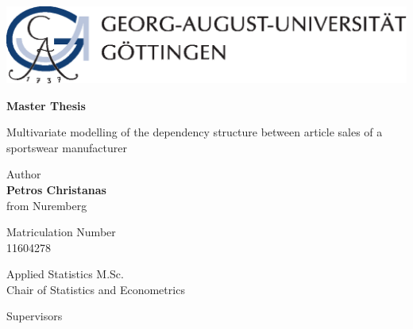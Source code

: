 
\thispagestyle{empty}
\begin{center}


\begin{minipage}{0.75\linewidth}
    \centering
    \includegraphics[scale = 0.7]{figures/uni_goettingen_logo.eps}\\
    
    \vspace{1cm}
    
{{\Huge \textbf{Master Thesis} \par}}
    
\vspace{0.5cm}
    
    {{\LARGE Multivariate modelling of the dependency structure between article sales of a sportswear manufacturer\par}}
    \vspace{1cm}
    
    
\begin{center}
Author\\
{\LARGE \textbf{Petros Christanas}} \\
{\large from Nuremberg}


\vspace{0.5cm}

Matriculation Number \\
{\large 11604278}

\vspace{1cm}

{\Large Applied Statistics M.Sc.}\\
{\large Chair of Statistics and Econometrics}

\end{center}
    
    \end{minipage}
\end{center}


\vspace{1.5cm}

\noindent Supervisors\\
 \\
 \\

\vspace{0.5cm}
    
\begin{flushleft}
 \\
\end{flushleft}

    
    

\clearpage